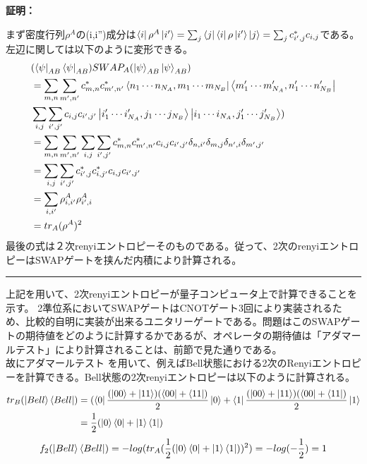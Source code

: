 \documentclass[a4paper,10.5pt]{article}
\numberwithin{equation}{section}
\newenvironment{proofbox}
{\begin{prooflabel}\textbf{証明：}\end{prooflabel}\vspace{0.8em}}
{\par\vspace{1em}\hrule\vspace{1em}}
\begin{document}
\begin{proofbox}
まず密度行列$\rho^{A}$の(i,i'')成分は$\bra{i}\rho^{A}\ket{i'}=\sum_{j}\bra{j}\bra{i}\rho\ket{i'}\ket{j}=\sum_{j}c_{i',j}^{*}c_{i,j}$である。左辺に関しては以下のように変形できる。
\begin{equation}\begin{split}
      &(\bra{\psi}_{AB}\bra{\psi}_{AB})SWAP_{A}(\ket{\psi}_{AB}\ket{\psi}_{AB})\\
      &=\sum_{m,n}\sum_{m',n'}c_{m,n}^{*}c_{m',n'}^{*}\bra{n_{1}\cdots n_{N_{A}},m_{1}\cdots m_{N_{B}}}\bra{m'_{1}\cdots m'_{N_{A}},n'_{1}\cdots n'_{N_{B}}}\\
      &\sum_{i,j}\sum_{i',j'}c_{i,j}c_{i',j'}\ket{i'_{1}\cdots i'_{N_{A}},j_{1}\cdots j_{N_{B}}}\ket{i_{1}\cdots i_{N_{A}},j'_{1}\cdots j'_{N_{B}}})\\   		  &=\sum_{m,n}\sum_{m',n'}\sum_{i,j}\sum_{i',j'}c_{m,n}^{*}c_{m',n'}^{*}c_{i,j}c_{i',j'}\delta_{n,i'}\delta_{m,j}\delta_{n',i}\delta_{m',j'}\\
      &=\sum_{i,j}\sum_{i',j'}c_{i',j}^{*}c_{i,j'}^{*}c_{i,j}c_{i',j'}\\
      &=\sum_{i,i'}\rho^{A}_{i,i'}\rho^{A}_{i',i}\\
	&=tr_{A}(\rho^{A})^{2}
\end{split} \end{equation}
最後の式は２次renyiエントロピーそのものである。従って、2次のrenyiエントロピーはSWAPゲートを挟んだ内積により計算される。
\end{proofbox}
上記を用いて、2次renyiエントロピーが量子コンピュータ上で計算できることを示す。
2準位系においてSWAPゲートはCNOTゲート3回により実装されるため、比較的自明に実装が出来るユニタリーゲートである。問題はこのSWAPゲートの期待値をどのように計算するかであるが、オペレータの期待値は「アダマールテスト」により計算されることは、前節で見た通りである。\\故にアダマールテスト
を用いて、例えばBell状態における2次のRenyiエントロピーを計算できる。Bell状態の2次renyiエントロピーは以下のように計算される。
\begin{equation}\begin{split}
    tr_{B}(\ket{Bell}\bra{Bell})&=(\bra{0}\frac{(\ket{00}+\ket{11})(\bra{00}+\bra{11})}{2}\ket{0}+\bra{1}\frac{(\ket{00}+\ket{11})(\bra{00}+\bra{11})}{2}\ket{1}\\
    &=\frac{1}{2}(\ket{0}\bra{0}+\ket{1}\bra{1})
\end{split} \end{equation}
    \begin{equation}\begin{split}
        f_{2}(\ket{Bell}\bra{Bell})=-log(tr_{A}(\frac{1}{2}(\ket{0}\bra{0}+\ket{1}\bra{1}))^2)
        =-log(-\frac{1}{2})=1
    \end{split} \end{equation}
\end{document}
